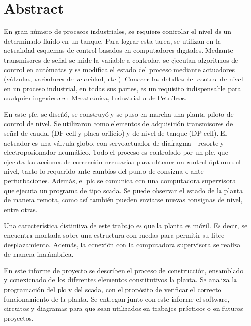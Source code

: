 \markboth{}{}
\pagestyle{empty}

\chapter*{Abstract}

En gran número de procesos industriales, se requiere controlar el
nivel de un determinado fluido en un tanque.
Para lograr esta tarea, se utilizan en la actualidad esquemas de control
basados en computadores digitales.
Mediante transmisores de señal se mide la variable a
controlar, se ejecutan algoritmos de control en autómatas y se
modifica el estado del proceso mediante actuadores (válvulas, variadores de
velocidad, etc.).
Conocer los detalles del control de nivel en un proceso industrial, en todas sus
partes, es un requisito
indispensable para cualquier ingeniero en Mecatrónica, Industrial o de
Petróleos.

En este \gls{pfe}, se diseñó, se construyó y se puso en marcha una planta
piloto de control de nivel.
Se utilizaron como elementos de adquisición transmisores de señal de caudal (DP cell y placa
orificio) y de nivel de tanque (DP cell).
El actuador es una válvula globo, con servoactuador de diafragma -
resorte y electroposionador neumático.
Todo el proceso es controlado por un \gls{plc},
que ejecuta las acciones de
corrección necesarias para obtener un control óptimo del nivel, tanto lo
requerido ante cambios del punto de consigna o ante perturbaciones.
Además, el \gls{plc} se comunica con una computadora supervisora que ejecuta
un programa de tipo \gls{scada}.
Se puede observar el estado de la
planta de manera remota, como así también pueden enviarse nuevas consignas de
nivel,
entre otras.

Una característica distintiva de este trabajo es que la planta es móvil.
Es decir, se encuentra montada sobre una estructura con ruedas para permitir su
libre desplazamiento.
Además, la conexión con la computadora supervisora se realiza de manera
inalámbrica.

En este informe de proyecto se describen el proceso de construcción,
ensamblado y conexionado de los diferentes elementos constitutivos la planta.
Se analiza la programación del \gls{plc} y del \gls{scada}, con el
propósito de verificar el correcto funcionamiento de la planta.
Se entregan junto con este informe el software, circuitos y diagramas para
que sean utilizados en trabajos prácticos o en futuros proyectos.


